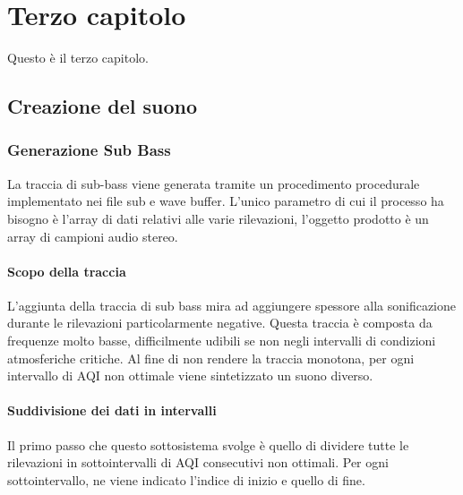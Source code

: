 \clearpage{\pagestyle{empty}\cleardoublepage}
\chapter{Terzo capitolo}                %


Questo \`e il terzo capitolo.

\section{Creazione del suono}
\subsection{Generazione Sub Bass}                 %
La traccia di sub-bass viene generata tramite un procedimento procedurale implementato nei file sub e wave buffer.
L'unico parametro di cui il processo ha bisogno è l'array di dati relativi alle varie rilevazioni, l'oggetto prodotto è un array di campioni audio stereo.
\subsubsection{Scopo della traccia}
L'aggiunta della traccia di sub bass mira ad aggiungere spessore alla sonificazione durante le rilevazioni particolarmente negative.
Questa traccia è composta da frequenze molto basse, difficilmente udibili se non negli intervalli di condizioni atmosferiche critiche.
Al fine di non rendere la traccia monotona, per ogni intervallo di AQI non ottimale viene sintetizzato un suono diverso.
\subsubsection{Suddivisione dei dati in intervalli}
Il primo passo che questo sottosistema svolge è quello di dividere tutte le rilevazioni in sottointervalli di AQI consecutivi non ottimali.
Per ogni sottointervallo, ne viene indicato l'indice di inizio e quello di fine.
